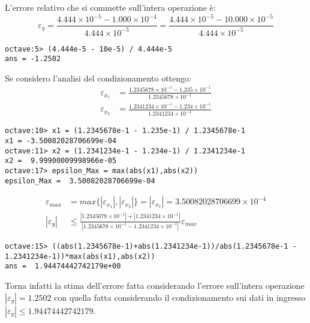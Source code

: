 L'errore relativo che si commette sull'intera operazione \`e:
\begin{displaymath}
	\varepsilon_{y} = \frac{4.444 \times 10^{-5} - 1.000 \times 10^{-4}}{4.444 \times 10^{-5}} = 
		 \frac{4.444 \times 10^{-5} - 10.000 \times 10^{-5}}{4.444 \times 10^{-5}} 
\end{displaymath}
\begin{lstlisting}
octave:5> (4.444e-5 - 10e-5) / 4.444e-5
ans = -1.2502
\end{lstlisting}
Se considero l'analisi del condizionamento ottengo:
\begin{displaymath}
\begin{split}
	\varepsilon_{x_{1}} & = \frac{1.2345678 \times 10^{-1} - 1.235 \times 10^{-1}}
			{1.2345678 \times 10^{-1}} \\
	\varepsilon_{x_{2}} & = \frac{1.2341234 \times 10^{-1} - 1.234 \times 10^{-1}}
			{1.2341234 \times 10^{-1}}
\end{split}
\end{displaymath}
\begin{lstlisting}
octave:10> x1 = (1.2345678e-1 - 1.235e-1) / 1.2345678e-1
x1 = -3.50082028706699e-04
octave:11> x2 = (1.2341234e-1 - 1.234e-1) / 1.2341234e-1
x2 =  9.99900009998966e-05
octave:17> epsilon_Max = max(abs(x1),abs(x2))
epsilon_Max =  3.50082028706699e-04
\end{lstlisting}
\begin{displaymath}
\begin{split}
	\varepsilon_{max} & = max \lbrace |\varepsilon_{x_{1}}|, |\varepsilon_{x_{2}}| \rbrace 
		= |\varepsilon_{x_{1}}| = 3.50082028706699 \times 10^{-4}\\
	|\varepsilon_{y}| & \leq \frac{|1.2345678 \times 10^{-1}| + |1.2341234 \times 10^{-1}|}
		{|1.2345678 \times 10^{-1} - 1.2341234 \times 10^{-1}|}\varepsilon_{max}
\end{split}
\end{displaymath}
\begin{lstlisting}
octave:15> ((abs(1.2345678e-1)+abs(1.2341234e-1))/abs(1.2345678e-1 - 1.2341234e-1))*max(abs(x1),abs(x2))
ans =  1.94474442742179e+00
\end{lstlisting}
Torna infatti la stima dell'errore fatta considerando l'errore sull'intera operazione $|\varepsilon_{y}| = 1.2502$ con quella fatta considerando il condizionamento sui dati in ingresso
$|\varepsilon_{y}| \leq 1.94474442742179$.

















